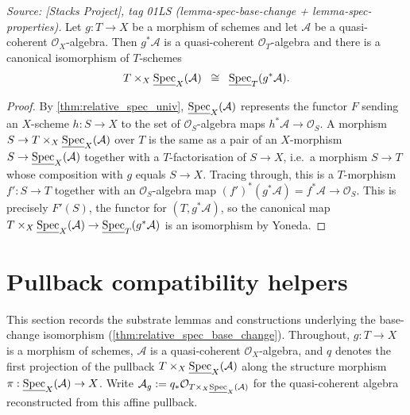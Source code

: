 \begin{theorem}
  \label{thm:relative_spec_base_change}
  \textit{Source: [Stacks Project], tag 01LS (lemma-spec-base-change +
  lemma-spec-properties).}
  Let \(g : T \to X\) be a morphism of schemes and let \(\mathcal{A}\) be a quasi-coherent
  \(\mathcal{O}_X\)-algebra. Then \(g^* \mathcal{A}\) is a quasi-coherent
  \(\mathcal{O}_T\)-algebra and there is a canonical isomorphism of \(T\)-schemes
  \[
    T \times_X \underline{\operatorname{Spec}}_X(\mathcal{A}) \;\;\cong\;\;
    \underline{\operatorname{Spec}}_T(g^* \mathcal{A}).
  \]
\end{theorem}

\begin{proof}
  By \cref{thm:relative_spec_univ}, \(\underline{\operatorname{Spec}}_X(\mathcal{A})\) represents
  the functor \(F\) sending an \(X\)-scheme \(h : S \to X\) to the set of
  \(\mathcal{O}_S\)-algebra maps \(h^*\mathcal{A} \to \mathcal{O}_S\). A morphism
  \(S \to T \times_X \underline{\operatorname{Spec}}_X(\mathcal{A})\) over \(T\) is the same as a pair of an
  \(X\)-morphism \(S \to \underline{\operatorname{Spec}}_X(\mathcal{A})\) together with a \(T\)-factorisation
  of \(S \to X\), i.e.\ a morphism \(S \to T\) whose composition with \(g\) equals
  \(S \to X\). Tracing through, this is a \(T\)-morphism \(f' : S \to T\) together with an
  \(\mathcal{O}_S\)-algebra map \((f')^*(g^*\mathcal{A}) = f^*\mathcal{A} \to \mathcal{O}_S\).
  This is precisely \(F'(S)\), the functor for \((T, g^*\mathcal{A})\), so the canonical map
  \(T \times_X \underline{\operatorname{Spec}}_X(\mathcal{A}) \to \underline{\operatorname{Spec}}_T(g^*\mathcal{A})\)
  is an isomorphism by Yoneda.
\end{proof}

\section{Pullback compatibility helpers}
\label{sec:relspec_pullback_helpers}

This section records the substrate lemmas and constructions underlying the
base-change isomorphism (\cref{thm:relative_spec_base_change}). Throughout,
\(g : T \to X\) is a morphism of schemes, \(\mathcal{A}\) is a quasi-coherent
\(\mathcal{O}_X\)-algebra, and \(q\) denotes the first projection of the pullback
\(T \times_X \underline{\operatorname{Spec}}_X(\mathcal{A})\) along the structure morphism
\(\pi : \underline{\operatorname{Spec}}_X(\mathcal{A}) \to X\). Write
\(\mathcal{A}_g := q_* \mathcal{O}_{T \times_X \underline{\operatorname{Spec}}_X(\mathcal{A})}\)
for the quasi-coherent algebra reconstructed from this affine pullback.

